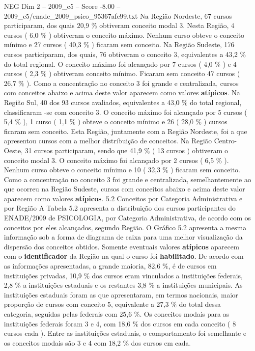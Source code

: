 \begin{textsample}{NEG Dim 2 – 2009\_c5 – Score -8.00 – 2009\_c5/enade\_2009\_psico\_95367afe99.txt}
Na Região Nordeste, 67 cursos participaram, dos quais 20,9 \% obtiveram conceito modal 3.
Nesta Região, 4 cursos ( 6,0 \% ) obtiveram o conceito máximo.
Nenhum curso obteve o conceito mínimo e 27 cursos ( 40,3 \% ) ficaram sem conceito.
Na Região Sudeste, 176 cursos participaram, dos quais, 76 obtiveram o conceito 3, equivalentes a 43,2 \% do total regional.
O conceito máximo foi alcançado por 7 cursos ( 4,0 \% ) e 4 cursos ( 2,3 \% ) obtiveram conceito mínimo.
Ficaram sem conceito 47 cursos ( 26,7 \% ).
Como a concentração no conceito 3 foi grande e centralizada, cursos com conceitos abaixo e acima deste valor aparecem como valores \textbf{atípicos}.
Na Região Sul, 40 dos 93 cursos avaliados, equivalentes a 43,0 \% do total regional, classificaram -se com conceito 3.
O conceito máximo foi alcançado por 5 cursos ( 5,4 \% ), 1 curso ( 1,1 \% ) obteve o conceito mínimo e 26 ( 28,0 \% ) cursos ficaram sem conceito.
Esta Região, juntamente com a Região Nordeste, foi a que apresentou cursos com a melhor distribuição de conceitos.
Na Região Centro-Oeste, 31 cursos participaram, sendo que 41,9 \% ( 13 cursos ) obtiveram o conceito modal 3.
O conceito máximo foi alcançado por 2 cursos ( 6,5 \% ).
Nenhum curso obteve o conceito mínimo e 10 ( 32,3 \% ) ficaram sem conceito.
Como a concentração no conceito 3 foi grande e centralizada, semelhantemente ao que ocorreu na Região Sudeste, cursos com conceitos abaixo e acima deste valor aparecem como valores \textbf{atípicos}. 5.2 Conceitos por Categoria Administrativa e por Região A Tabela 5.2 apresenta a distribuição dos cursos participantes do ENADE/2009 de PSICOLOGIA, por Categoria Administrativa, de acordo com os conceitos por eles alcançados, segundo Região.
O Gráfico 5.2 apresenta a mesma informação sob a forma de diagrama de caixa para uma melhor visualização da dispersão dos conceitos obtidos.
Somente eventuais valores \textbf{atípicos} aparecem com o \textbf{identificador} da Região na qual o curso foi \textbf{habilitado}.
De acordo com as informações apresentadas, a grande maioria, 82,6 \%, é de cursos em instituições privadas, 10,9 \% dos cursos eram vinculados a instituições federais, 2,8 \% a instituições estaduais e os restantes 3,8 \% a instituições municipais.
As instituições estaduais foram as que apresentaram, em termos nacionais, maior proporção de cursos com conceito 5, equivalente a 27,3 \% do total dessa categoria, seguidas pelas federais com 25,6 \%.
Os conceitos modais para as instituições federais foram 3 e 4, com 18,6 \% dos cursos em cada conceito ( 8 cursos cada ).
Entre as instituições estaduais, o comportamento foi semelhante e os conceitos modais são 3 e 4 com 18,2 \% dos cursos em cada.

\end{textsample}
